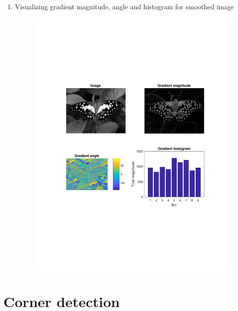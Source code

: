 \documentclass[10pt,letterpaper]{article}
\begin{document}
\begin{enumerate}
\item Visualizing gradient magnitude, angle and histogram for smoothed image
\begin{figure}[h]
\centering
\includegraphics[width=0.9\linewidth]{../latex/figs/butterfly-result.pdf}
\end{figure}
\end{enumerate}
\newpage

\section{Corner detection}
\end{document}
